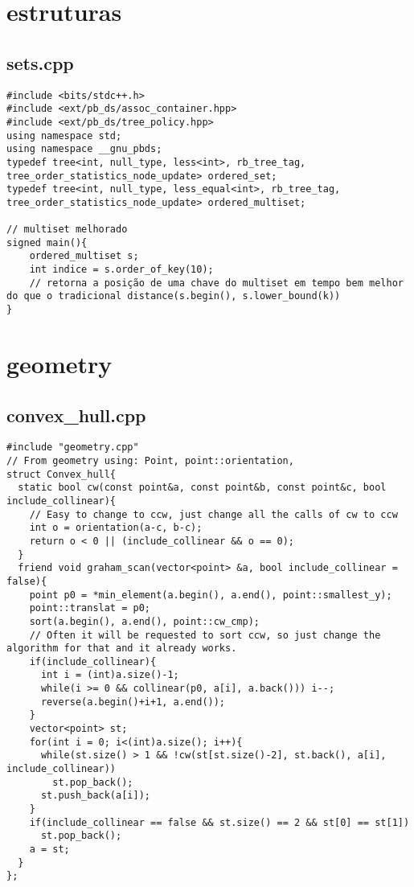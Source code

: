 \documentclass[11pt,landscape,twocolumn]{article}
\begin{document}
\section{estruturas}
\subsection*{sets.cpp}
\begin{lstlisting}
#include <bits/stdc++.h>
#include <ext/pb_ds/assoc_container.hpp>
#include <ext/pb_ds/tree_policy.hpp>
using namespace std;
using namespace __gnu_pbds;
typedef tree<int, null_type, less<int>, rb_tree_tag, tree_order_statistics_node_update> ordered_set;
typedef tree<int, null_type, less_equal<int>, rb_tree_tag, tree_order_statistics_node_update> ordered_multiset;
 
// multiset melhorado 
signed main(){
	ordered_multiset s;
	int indice = s.order_of_key(10);
	// retorna a posição de uma chave do multiset em tempo bem melhor do que o tradicional distance(s.begin(), s.lower_bound(k)) 	
}
\end{lstlisting}

\section{geometry}
\subsection*{convex\_hull.cpp}
\begin{lstlisting}
#include "geometry.cpp"
// From geometry using: Point, point::orientation, 
struct Convex_hull{
  static bool cw(const point&a, const point&b, const point&c, bool include_collinear){
    // Easy to change to ccw, just change all the calls of cw to ccw
    int o = orientation(a-c, b-c);
    return o < 0 || (include_collinear && o == 0);
  }
  friend void graham_scan(vector<point> &a, bool include_collinear = false){
    point p0 = *min_element(a.begin(), a.end(), point::smallest_y);
    point::translat = p0;
    sort(a.begin(), a.end(), point::cw_cmp);
    // Often it will be requested to sort ccw, so just change the algorithm for that and it already works.
    if(include_collinear){ 
      int i = (int)a.size()-1;
      while(i >= 0 && collinear(p0, a[i], a.back())) i--;
      reverse(a.begin()+i+1, a.end());
    }
    vector<point> st;
    for(int i = 0; i<(int)a.size(); i++){
      while(st.size() > 1 && !cw(st[st.size()-2], st.back(), a[i], include_collinear))
        st.pop_back();
      st.push_back(a[i]);
    }
    if(include_collinear == false && st.size() == 2 && st[0] == st[1])
      st.pop_back();
    a = st;
  }
};
\end{lstlisting}
\end{document}

